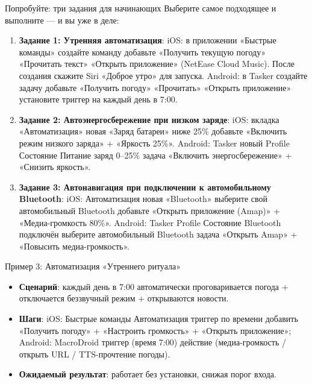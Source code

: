 \begin{tcbpractice}{Попробуйте: три задания для начинающих}
Выберите самое подходящее и выполните — и вы уже в деле:

\begin{enumerate}
  \item \textbf{Задание 1: Утренняя автоматизация}: iOS: в приложении «Быстрые команды» создайте команду добавьте «Получить текущую погоду» «Прочитать текст» «Открыть приложение» (NetEase Cloud Music). После создания скажите Siri «Доброе утро» для запуска. Android: в Tasker создайте задачу добавьте «Получить погоду» «Прочитать» «Открыть приложение» установите триггер на каждый день в 7:00.
  \item \textbf{Задание 2: Автоэнергосбережение при низком заряде}: iOS: вкладка «Автоматизация» новая «Заряд батареи» ниже 25\% добавьте «Включить режим низкого заряда» + «Яркость 25\%». Android: Tasker новый Profile Состояние Питание заряд 0–25\% задача «Включить энергосбережение» + «Снизить яркость».
  \item \textbf{Задание 3: Автонавигация при подключении к автомобильному Bluetooth}: iOS: Автоматизация новая «Bluetooth» выберите свой автомобильный Bluetooth добавьте «Открыть приложение (Amap)» + «Медиа-громкость 80\%». Android: Tasker Profile Состояние Bluetooth подключён выберите автомобильный Bluetooth задача «Открыть Amap» + «Повысить медиа-громкость».
\end{enumerate}

\end{tcbpractice}

\begin{tcbinfo}{Пример 3: Автоматизация «Утреннего ритуала»}
\begin{itemize}
  \item \textbf{Сценарий}: каждый день в 7:00 автоматически проговаривается погода + отключается беззвучный режим + открываются новости.
  \item \textbf{Шаги}: iOS: Быстрые команды Автоматизация триггер по времени добавить «Получить погоду» + «Настроить громкость» + «Открыть приложение»; Android: MacroDroid триггер (время 7:00) действие (медиа-громкость / открыть URL / TTS-прочтение погоды).
  \item \textbf{Ожидаемый результат}: работает без установки, снижая порог входа.
\end{itemize}

\end{tcbinfo}
